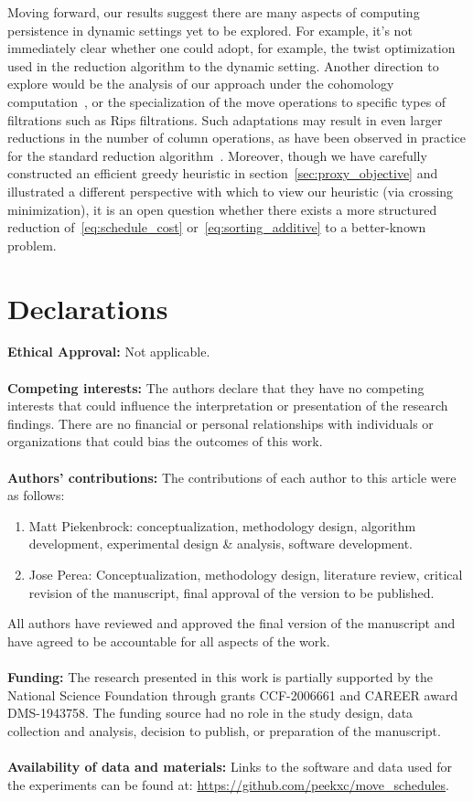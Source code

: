 \documentclass[sn-mathphys]{sn-jnl}
\begin{document}
Moving forward, our results suggest there are many aspects of computing persistence in dynamic settings yet to be explored. 
For example, it's not immediately clear whether one could adopt, for example, the twist optimization~\cite{chen2011persistent} used in the reduction algorithm to the dynamic setting. Another direction to explore would be the analysis of our approach under the cohomology computation~\cite{de2011dualities}, or the specialization of the move operations to specific types of filtrations such as Rips filtrations. Such adaptations may result in even larger reductions in the number of column operations, as have been observed in practice for the standard reduction algorithm~\cite{bauer2021ripser}. 
Moreover, though we have carefully constructed an efficient greedy heuristic in section~\ref{sec:proxy_objective} and illustrated a different perspective with which to view our heuristic (via crossing minimization), it is an open question whether there exists a more structured reduction of~\eqref{eq:schedule_cost} or~\eqref{eq:sorting_additive} to a better-known problem. 


\section{Declarations}
 
\textbf{Ethical Approval:} Not applicable.
\\
\\
\noindent \textbf{Competing interests:} 
The authors declare that they have no competing interests that could influence the interpretation or presentation of the research findings. There are no financial or personal relationships with individuals or organizations that could bias the outcomes of this work.
\\
\\
\noindent
\textbf{Authors' contributions:}
The contributions of each author to this article were as follows:
\begin{enumerate}
	\item Matt Piekenbrock: conceptualization, methodology design, algorithm development, experimental design \& analysis, software development. 
	\item Jose Perea: Conceptualization, methodology design, literature review, critical revision of the manuscript, final approval of the version to be published.
\end{enumerate}
All authors have reviewed and approved the final version of the manuscript and have agreed to be accountable for all aspects of the work.
\\
\\
\noindent 
\textbf{Funding:}
The research presented in this work is partially supported by the National Science Foundation through grants CCF-2006661 and CAREER award DMS-1943758. The funding source had no role in the study design, data collection and analysis, decision to publish, or preparation of the manuscript.
\\
\\
\noindent \textbf{Availability of data and materials:} Links to the software and data used for the experiments can be found at: \url{https://github.com/peekxc/move_schedules}.
\end{document}
